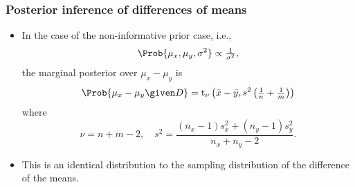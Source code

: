 \documentclass{slides}
\begin{document}
\begin{frame}
	\frametitle{Posterior inference of differences of means}
	\begin{itemize}
		\item In the case of the non-informative prior case, i.e.,
			\[\Prob{\mu_x, \mu_y, \sigma^2} \propto \tfrac{1}{\sigma^2},\]
		the marginal posterior over $\mu_x - \mu_y$ is
		\begin{align*}
			\Prob{\mu_x-\mu_y \given D} = \textrm{t}_{\nu}\left(\bar{x}-\bar{y}, s^2\left(\tfrac{1}{n}+\tfrac{1}{m}\right)\right)
		\end{align*}
		where
		\[ \nu = n + m -2,\quad s^2 = \frac{(n_x-1)s^2_x + (n_y-1)s^2_y}{n_x + n_y - 2}.\]
	\item This is an identical distribution to the sampling distribution of the difference of the means.
	\end{itemize}
\end{frame}

%
\end{document}
